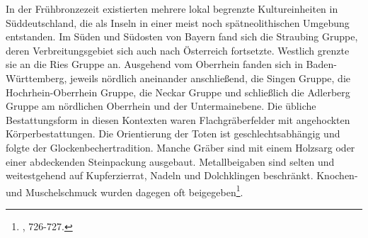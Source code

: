 \documentclass[openany,twoside,twocolumn]{book}
\let\rmarkdownfootnote\footnote%
\def\footnote{\protect\rmarkdownfootnote}
\begin{document}
In der Frühbronzezeit existierten mehrere lokal begrenzte Kultureinheiten in Süddeutschland, die als Inseln in einer meist noch spätneolithischen Umgebung entstanden. Im Süden und Südosten von Bayern fand sich die Straubing Gruppe, deren Verbreitungsgebiet sich auch nach Österreich fortsetzte. Westlich grenzte sie an die Ries Gruppe an. Ausgehend vom Oberrhein fanden sich in Baden-Württemberg, jeweils nördlich aneinander anschließend, die Singen Gruppe, die Hochrhein-Oberrhein Gruppe, die Neckar Gruppe und schließlich die Adlerberg Gruppe am nördlichen Oberrhein und der Untermainebene. Die übliche Bestattungsform in diesen Kontexten waren Flachgräberfelder mit angehockten Körperbestattungen. Die Orientierung der Toten ist geschlechtsabhängig und folgte der Glockenbechertradition. Manche Gräber sind mit einem Holzsarg oder einer abdeckenden Steinpackung ausgebaut. Metallbeigaben sind selten und weitestgehend auf Kupferzierrat, Nadeln und Dolchklingen beschränkt. Knochen- und Muschelschmuck wurden dagegen oft beigegeben\footnote{\textcite{jockenhovel_germany_2013}, 726-727.}.
\end{document}
